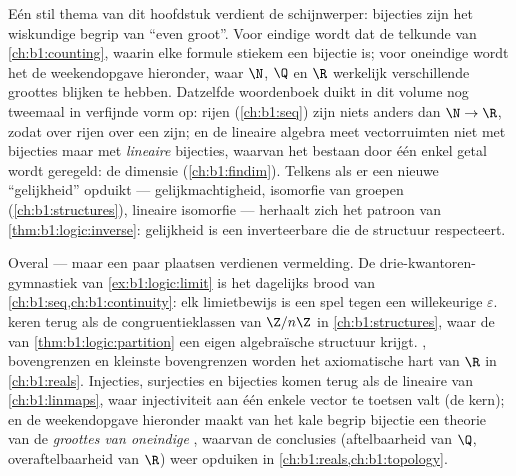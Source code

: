 \begin{remark}\label{rem:b1:logic:interlude}
Eén stil thema van dit hoofdstuk verdient de schijnwerper: bijecties zijn
het wiskundige begrip van ``even groot''. Voor eindige 
wordt dat de telkunde van \cref{ch:b1:counting}, waarin elke formule
stiekem een bijectie is; voor oneindige  wordt het de
weekendopgave hieronder, waar $\N$, $\Q$ en $\R$ werkelijk verschillende
groottes blijken te hebben. Datzelfde woordenboek duikt in dit volume nog
tweemaal in verfijnde vorm op: rijen (\cref{ch:b1:seq}) zijn niets anders
dan  $\N \to \R$, zodat  over rijen  over
een   zijn; en de lineaire algebra meet
vectorruimten niet met bijecties maar met \emph{lineaire} bijecties,
waarvan het bestaan door één enkel getal wordt geregeld: de dimensie
(\cref{ch:b1:findim}). Telkens als er een nieuwe ``gelijkheid'' opduikt
--- gelijkmachtigheid, isomorfie van groepen (\cref{ch:b1:structures}),
lineaire isomorfie --- herhaalt zich het patroon van
\cref{thm:b1:logic:inverse}: gelijkheid is een inverteerbare 
die de structuur respecteert.
\end{remark}

\begin{remark}\label{rem:b1:logic:whereused}
Overal --- maar een paar plaatsen verdienen vermelding. De
drie-kwantoren-gymnastiek van \cref{ex:b1:logic:limit} is het dagelijks
brood van \cref{ch:b1:seq,ch:b1:continuity}: elk limietbewijs is een spel
tegen een willekeurige $\varepsilon$.  keren terug als
de congruentieklassen van $\Z/n\Z$ in \cref{ch:b1:structures}, waar de
 van \cref{thm:b1:logic:partition} een eigen algebraïsche
structuur krijgt. , bovengrenzen en kleinste
bovengrenzen worden het axiomatische hart van $\R$ in
\cref{ch:b1:reals}. Injecties, surjecties en bijecties komen terug als de
lineaire  van \cref{ch:b1:linmaps}, waar injectiviteit aan
één enkele vector te toetsen valt (de kern); en de weekendopgave
hieronder maakt van het kale begrip bijectie een theorie van de
\emph{groottes van oneindige }, waarvan de conclusies
(aftelbaarheid van $\Q$, overaftelbaarheid van $\R$) weer opduiken in
\cref{ch:b1:reals,ch:b1:topology}.
\end{remark}

